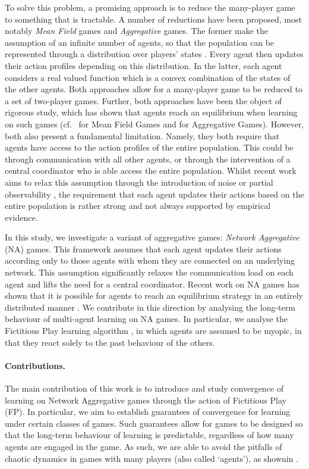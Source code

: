 \documentclass{article}
\theoremstyle{definition}
\begin{document}
To solve this problem, a promising approach is to reduce the
many-player game to something that is tractable. A number of
reductions have been proposed, most notably \emph{Mean Field} games
and \emph{Aggregative} games. The former make the assumption of an
infinite number of agents, so that the population can be represented
through a distribution over players' states \cite{Huang2006}. Every
agent then updates their action profiles depending on this
distribution. In the latter, each agent considers a real valued
function which is a convex combination of the states of the other
agents. Both approaches allow for a many-player game to be reduced
to a set of two-player games.
%
Further, both approaches have been the object of rigorous study, which has
 shown that agents reach an equilibrium when learning on such
games (cf.~\cite{Perrin2020} for Mean Field Games and
\cite{Jensen2010, DePersis2020, Parise2020} for Aggregative
Games). However, both also present a fundamental limitation.  Namely,
they both require that agents have access to the action profiles of
the entire population.  This could be through communication with all
other agents, or through the intervention of a central coordinator who
is able access the entire population. Whilst recent work aims to relax
this assumption through the introduction of noise \cite{Perrin2020} or
partial observability \cite{Elie2020}, the requirement that each agent
updates their actions based on the entire population is rather strong
and not always supported by empirical evidence.

In this study, we investigate a variant of aggregative games:
\emph{Network Aggregative} (NA) games. This framework assumes that
each agent updates their actions according only to those agents with
whom they are connected on an underlying network. This assumption
significantly relaxes the communication load on each agent and lifts
the need for a central coordinator. Recent work on NA games has shown
that it is possible for agents to reach an equilibrium strategy in an
entirely distributed manner \cite{Koshal2016, Shokri2020, Shokri2021,
  Parise2015}. We contribute in this direction by analysing the
long-term behaviour of multi-agent learning on NA games. In
particular, we analyse the Fictitious Play learning algorithm
\cite{Brown1949,Harris1998}, in which agents are assumed to be
myopic, in that they react solely to the past behaviour of the others.


\paragraph{Contributions.}
%
  The main contribution of this work is to introduce and study convergence of
  learning on Network Aggregative games through the action of
  Fictitious Play (FP). In particular, we aim to establish guarantees
  of convergence for learning under certain classes of games. Such guarantees
  allow for games to be designed so that the long-term behaviour of
  learning is predictable, regardless of how many agents are engaged
  in the game. As such, we are able to avoid the pitfalls of chaotic
  dynamics in games with many players (also called `agents'), as shownin \cite{Sanders2018}.
\end{document}
